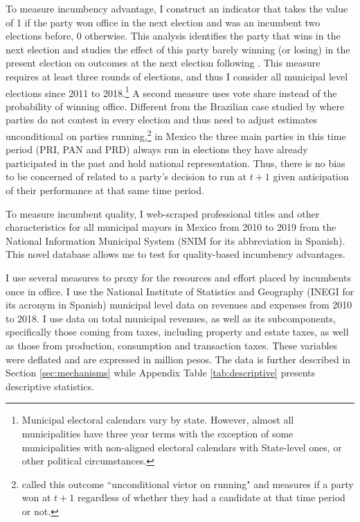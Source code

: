 \documentclass[12pt]{amsart}
\makeatletter
\def\subsection{\@startsection{subsection}{2}
	\z@{.8\linespacing\@plus.7\linespacing}{.7\linespacing}{\large}}
\numberwithin{equation}{section}
\theoremstyle{definition}
\theoremstyle{definition}
\theoremstyle{definition}
\makeatother
\begin{document}
\subsection{Data}

To measure incumbency advantage, I construct an indicator that takes the value of 1 if the party won office in the next election and was an incumbent two elections before, 0 otherwise. This analysis identifies the party that wins in the next election and studies the effect of this party barely winning (or losing) in the present election on outcomes at the next election following \citet{klasnja_titiunik_2017}. This measure requires at least three rounds of elections, and thus I consider all municipal level elections since 2011 to 2018.\footnote{Municipal electoral calendars vary by state. However, almost all municipalities have three year terms with the exception of some municipalities with non-aligned electoral calendars with State-level ones, or other political circumstances.} A second measure uses vote share instead of the probability of winning office. Different from the Brazilian case studied by \citet{klasnja_titiunik_2017} where parties do not contest in every election and thus need to adjust estimates unconditional on parties running,\footnote{\citet{klasnja_titiunik_2017} called this outcome ``unconditional victor on running" and measures if a party won at $t+1$ regardless of whether they had a candidate at that time period or not.} in Mexico the three main parties in this time period (PRI, PAN and PRD) always run in elections they have already participated in the past and hold national representation. Thus, there is no bias to be concerned of related to a party's decision to run at $t+1$ given anticipation of their performance at that same time period.  

To measure incumbent quality, I web-scraped professional titles and other characteristics for all municipal mayors in Mexico from 2010 to 2019 from the National Information Municipal System (SNIM for its abbreviation in Spanish). This novel database allows me to test for quality-based incumbency advantages.

I use several measures to proxy for the resources and effort placed by incumbents once in office. I use the National Institute of Statistics and Geography (INEGI for its acronym in Spanish) municipal level data on revenues and expenses from 2010 to 2018. I use data on total municipal revenues, as well as its subcomponents, specifically those coming from taxes, including property and estate taxes, as well as those from production, consumption and transaction taxes. These variables were deflated and are expressed in million pesos. The data is further described in Section \ref{sec:mechanisms} while Appendix Table \ref{tab:descriptive} presents descriptive statistics.
\end{document}
